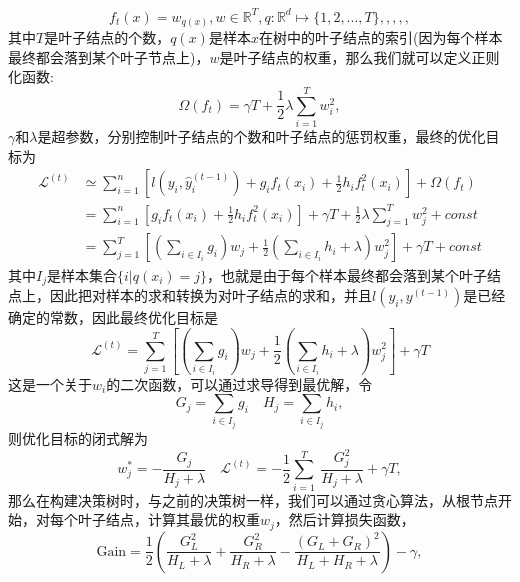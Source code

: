 \begin{equation}
	f_t(x)=w_{q(x)},w\in\mathbb{R}^T,q\colon\mathbb{R}^d\mapsto\{1,2,...,T\},,,,,
\end{equation}
其中$T$是叶子结点的个数，$q(x)$是样本$x$在树中的叶子结点的索引(因为每个样本最终都会落到某个叶子节点上)，$w$是叶子结点的权重，那么我们就可以定义正则化函数:
\begin{equation}
	\Omega(f_t)=\gamma T+\frac{1}{2}\lambda\sum_{i=1}^{T}w_i^2,
\end{equation}
$\gamma$和$\lambda$是超参数，分别控制叶子结点的个数和叶子结点的惩罚权重，最终的优化目标为
\begin{equation}
	\begin{aligned}
		\mathcal{L}^{(t)} & \simeq\sum_{i=1}^{n}\left[l\left(y_{i},\hat{y}_{i}^{(t-1)}\right)+g_{i}f_{t}(x_{i})+\frac{1}{2}h_{i}f_{t}^{2}(x_{i})\right]+\Omega(f_{t})
		\\
		                  & =\sum_{i=1}^{n}\left[g_{i}f_{t}(x_{i})+\frac{1}{2}h_{i}f_{t}^{2}(x_{i})\right]+\gamma T+\frac{1}{2}\lambda\sum_{j=1}^{T}w_{j}^{2}+const
		\\
		                  & =\sum_{j=1}^{T}\left[(\sum_{i\in I_{i}}g_{i})w_{j}+\frac{1}{2}(\sum_{i\in I_{i}}h_{i}+\lambda)w_{j}^{2}\right]+\gamma T+const
	\end{aligned}
\end{equation}
其中$I_j$是样本集合$\{i|q(x_i)=j\}$，也就是由于每个样本最终都会落到某个叶子结点上，因此把对样本的求和转换为对叶子结点的求和，并且$l(y_i,y^{(t-1)})$是已经确定的常数，因此最终优化目标是
\begin{equation}
	\mathcal{L}^{(t)}=\sum_{j=1}^{T}\left[(\sum_{i\in I_{i}}g_{i})w_{j}+\frac{1}{2}(\sum_{i\in I_{i}}h_{i}+\lambda)w_{j}^{2}\right]+\gamma T
\end{equation}
这是一个关于$w_i$的二次函数，可以通过求导得到最优解，令
\begin{equation}
	G_j=\sum_{i \in I_j}g_i\quad H_j=\sum_{i \in I_j}h_i,
\end{equation}
则优化目标的闭式解为
\begin{equation}
	w_{j}^{*}=-\frac{G_{j}}{H_{j}+\lambda}\quad \mathcal{L}^{(t)}=-\frac{1}{2}\sum_{i=1}^{T}\:\frac{G_{j}^{2}}{H_{j}+\lambda}+\gamma T,
\end{equation}
那么在构建决策树时，与之前的决策树一样，我们可以通过贪心算法，从根节点开始，对每个叶子结点，计算其最优的权重$w_j$，然后计算损失函数，
\begin{equation}
	\text{Gain}=\frac{1}{2}(\frac{G_{L}^{2}}{H_{L}+\lambda}+\frac{G_{R}^{2}}{H_{R}+\lambda}-\frac{(G_{L}+G_{R})^{2}}{H_{L}+H_{R}+\lambda})-\gamma,
\end{equation}
